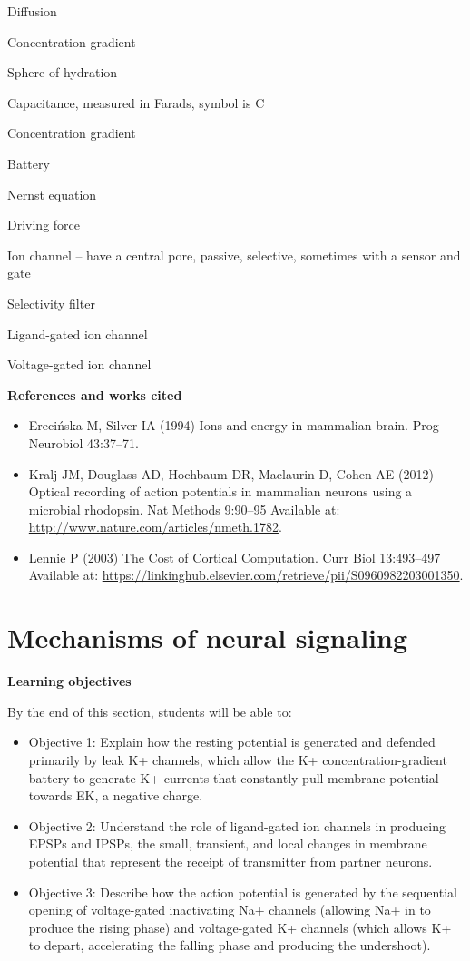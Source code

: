 \documentclass[
]{book}
\providecommand{\tightlist}{%
  \setlength{\itemsep}{0pt}\setlength{\parskip}{0pt}}
\begin{document}
Diffusion

Concentration gradient

Sphere of hydration

Capacitance, measured in Farads, symbol is C

Concentration gradient

Battery

Nernst equation

Driving force

Ion channel -- have a central pore, passive, selective, sometimes with a sensor and gate

Selectivity filter

Ligand-gated ion channel

Voltage-gated ion channel

\textbf{References and works cited}

\begin{itemize}
\item
  Erecińska M, Silver IA (1994) Ions and energy in mammalian brain. Prog Neurobiol 43:37--71.
\item
  Kralj JM, Douglass AD, Hochbaum DR, Maclaurin D, Cohen AE (2012) Optical recording of action potentials in mammalian neurons using a microbial rhodopsin. Nat Methods 9:90--95 Available at: \url{http://www.nature.com/articles/nmeth.1782}.
\item
  Lennie P (2003) The Cost of Cortical Computation. Curr Biol 13:493--497 Available at: \url{https://linkinghub.elsevier.com/retrieve/pii/S0960982203001350}.
\end{itemize}

\hypertarget{neurophysiology-mechanisms}{%
\section{Mechanisms of neural signaling}\label{neurophysiology-mechanisms}}

\textbf{Learning objectives}

By the end of this section, students will be able to:

\begin{itemize}
\tightlist
\item
  Objective 1: Explain how the resting potential is generated and defended primarily by leak K+ channels, which allow the K+ concentration-gradient battery to generate K+ currents that constantly pull membrane potential towards EK, a negative charge.\\
\item
  Objective 2: Understand the role of ligand-gated ion channels in producing EPSPs and IPSPs, the small, transient, and local changes in membrane potential that represent the receipt of transmitter from partner neurons.\\
\item
  Objective 3: Describe how the action potential is generated by the sequential opening of voltage-gated inactivating Na+ channels (allowing Na+ in to produce the rising phase) and voltage-gated K+ channels (which allows K+ to depart, accelerating the falling phase and producing the undershoot).
\end{itemize}
\end{document}

